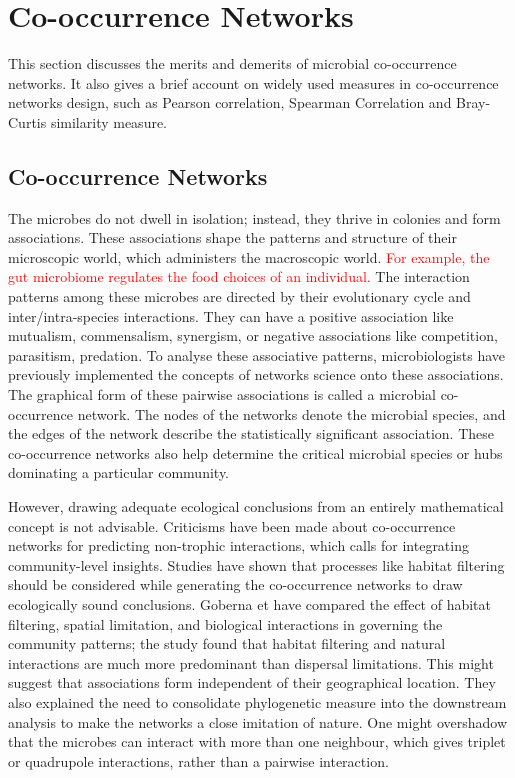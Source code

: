 \chapter{Co-occurrence Networks}
 \setcounter{page}{18}

This section discusses the merits and demerits of microbial co-occurrence networks. It also gives a brief account on widely used measures in co-occurrence networks design, such as Pearson correlation, Spearman Correlation and Bray-Curtis similarity measure.

\section{Co-occurrence Networks}
The microbes do not dwell in isolation; instead, they thrive in colonies and form associations. These associations shape the patterns and structure of their microscopic world, which administers the macroscopic world. \textcolor{red}{For example, the gut microbiome regulates the food choices of an individual.} The interaction patterns among these microbes are directed by their evolutionary cycle and inter/intra-species interactions. They can have a positive association like mutualism, commensalism, synergism, or negative associations like competition, parasitism, predation. To analyse these associative patterns, microbiologists have previously implemented the concepts of networks science onto these associations. The graphical form of these pairwise associations is called a microbial co-occurrence network. The nodes of the networks denote the microbial species, and the edges of the network describe the statistically significant association. These co-occurrence networks also help determine the critical microbial species or hubs dominating a particular community.\newline

However, drawing adequate ecological conclusions from an entirely mathematical concept is not advisable. Criticisms have been made about co-occurrence networks for predicting non-trophic interactions, which calls for integrating community-level insights. Studies have shown that processes like habitat filtering should be considered while generating the co-occurrence networks to draw ecologically sound conclusions. Goberna et have compared the effect of habitat filtering, spatial limitation, and biological interactions in governing the community patterns; the study found that habitat filtering and natural interactions are much more predominant than dispersal limitations. This might suggest that associations form independent of their geographical location. They also explained the need to consolidate phylogenetic measure into the downstream analysis to make the networks a close imitation of nature. One might overshadow that the microbes can interact with more than one neighbour, which gives triplet or quadrupole interactions, rather than a pairwise interaction.

